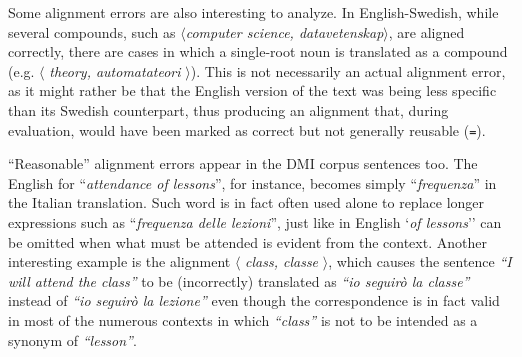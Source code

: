 Some alignment errors are also interesting to analyze.
In English-Swedish, while several compounds, such as $\langle$\textit{computer science, datavetenskap}$\rangle$, are aligned correctly, there are cases in which a single-root noun is translated as a compound (e.g. $\langle$ \textit{theory, automatateori} $\rangle$). This is not necessarily an actual alignment error, as it might rather be that the English version of the text was being less specific than its Swedish counterpart, thus producing an alignment that, during evaluation, would have been marked as correct but not generally reusable (\texttt{=}). \smallskip

``Reasonable'' alignment errors appear in the DMI corpus sentences too. 
The English for ``\textit{attendance of lessons}'', for instance, becomes simply ``\textit{frequenza}'' in the Italian translation. 
Such word is in fact often used alone to replace longer expressions such as ``\textit{frequenza delle lezioni}'', just like in English `\textit{of lessons}'' can be omitted when what must be attended is evident from the context.
Another interesting example is the alignment $\langle$ \textit{class, classe} $\rangle$, which causes the sentence \textit{``I will attend the class''} to be (incorrectly) translated as \textit{``io seguirò la classe''} instead of \textit{``io seguirò la lezione''} even though the correspondence is in fact valid in most of the numerous contexts in which \textit{``class''} is not to be intended as a synonym of \textit{``lesson''}.